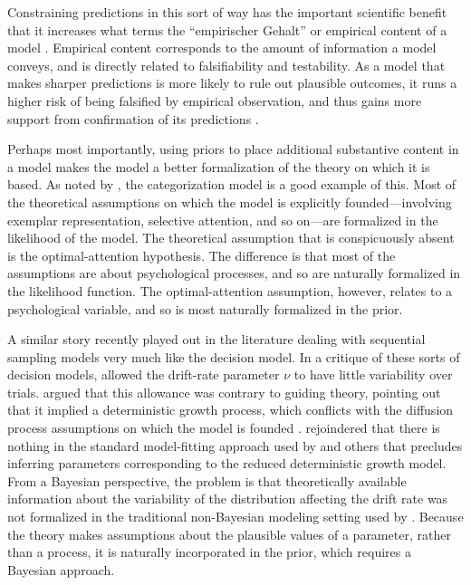 Constraining predictions in this sort of way has the important scientific benefit that it increases what  terms the ``empirischer Gehalt'' or empirical content of a model \cite<see also>{GloecknerBetsch2011,VanpaemelLee2012}. Empirical content corresponds to the amount of information a model conveys, and is directly related to falsifiability and testability. As a model that makes sharper predictions is more likely to rule out plausible outcomes, it runs a higher risk of being falsified by empirical observation, and thus gains more support from confirmation of its predictions \cite{Lakatos1978,RobertsPashler2000,Vanpaemel2016b}.

Perhaps most importantly, using priors to place additional substantive content in a model makes the model a better formalization of the theory on which it is based. As noted by , the categorization model is a good example of this. Most of the theoretical assumptions on which the model is explicitly founded---involving exemplar representation, selective attention, and so on---are formalized in the likelihood of the model. The theoretical assumption that is conspicuously absent is the optimal-attention hypothesis. The difference is that most of the assumptions are about psychological processes, and so are naturally formalized in the likelihood function. The optimal-attention assumption, however, relates to a psychological variable, and so is most naturally formalized in the prior.

A similar story recently played out in the literature dealing with sequential sampling models very much like the decision model. In a critique of these sorts of decision models,  allowed the drift-rate parameter $\nu$ to have little variability over trials.  argued that this allowance was contrary to guiding theory, pointing out that it implied a deterministic growth process, which conflicts with the diffusion process assumptions on which the model is founded \cite{RatcliffSmith2004}.  rejoindered that there is nothing in the standard model-fitting approach used by  and others that precludes inferring parameters corresponding to the reduced deterministic growth model. From a Bayesian perspective, the problem is that theoretically available information about the variability of the distribution affecting the drift rate was not formalized in the traditional non-Bayesian modeling setting used by . Because the theory makes assumptions about the plausible values of a parameter, rather than a process, it is naturally incorporated in the prior, which requires a Bayesian approach.

